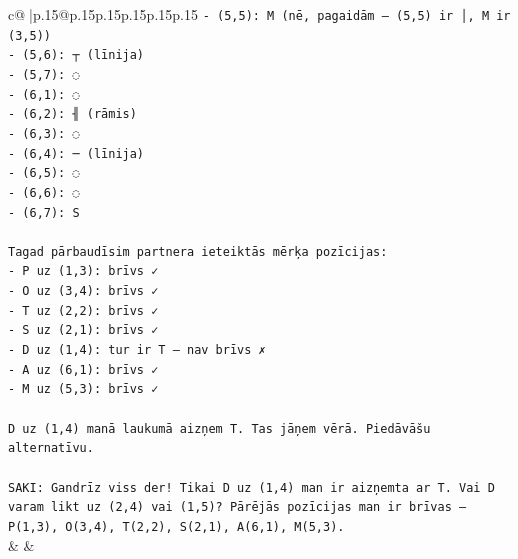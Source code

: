 \documentclass{article}
\begin{document}
{\begin{supertabular}{c@{$\;$}|p{.15\linewidth}@{}p{.15\linewidth}p{.15\linewidth}p{.15\linewidth}p{.15\linewidth}p{.15\linewidth}}
{{{\texttt{{-} (5,5): M (nē, pagaidām — (5,5) ir │, M ir (3,5))} \\
\texttt{{-} (5,6): ┬ (līnija)} \\
\texttt{{-} (5,7): ◌} \\
\texttt{{-} (6,1): ◌} \\
\texttt{{-} (6,2): ╢ (rāmis)} \\
\texttt{{-} (6,3): ◌} \\
\texttt{{-} (6,4): ─ (līnija)} \\
\texttt{{-} (6,5): ◌} \\
\texttt{{-} (6,6): ◌} \\
\texttt{{-} (6,7): S} \\
\\ 
\texttt{Tagad pārbaudīsim partnera ieteiktās mērķa pozīcijas:} \\
\texttt{{-} P uz (1,3): brīvs ✓} \\
\texttt{{-} O uz (3,4): brīvs ✓} \\
\texttt{{-} T uz (2,2): brīvs ✓} \\
\texttt{{-} S uz (2,1): brīvs ✓} \\
\texttt{{-} D uz (1,4): tur ir T — nav brīvs ✗} \\
\texttt{{-} A uz (6,1): brīvs ✓} \\
\texttt{{-} M uz (5,3): brīvs ✓} \\
\\ 
\texttt{D uz (1,4) manā laukumā aizņem T. Tas jāņem vērā. Piedāvāšu alternatīvu.} \\
\\ 
\texttt{SAKI: Gandrīz viss der! Tikai D uz (1,4) man ir aizņemta ar T. Vai D varam likt uz (2,4) vai (1,5)? Pārējās pozīcijas man ir brīvas — P(1,3), O(3,4), T(2,2), S(2,1), A(6,1), M(5,3).} \\
            }
        }
    }
    & & \\ \\


\end{supertabular}}
\end{document}
